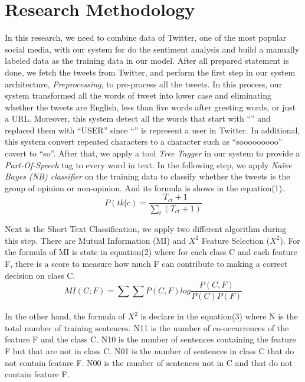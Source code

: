 \documentclass[a4paper,12pt]{article}
\begin{document}
\section{Research Methodology}
\hspace{1cm}In this research, we need to combine data of Twitter, one of the most popular social media, with our system for do the sentiment analysis and build a manually labeled data as the training data \cite{XBP2008} in our model. After all prepared statement is done, we fetch the tweets from Twitter, and perform the first step in our system architecture, \textit{Preprocessing}, to pre-process all the tweets. In this process, our system transformed all the words of tweet into lower case and eliminating whether the tweets are English, less than five words after greeting words, or just a URL. Moreover, this system detect all the words that start with “\@” and replaced them with “USER” since “\@” is represent a user in Twitter. In additional, this system convert repeated characters to a character such as “sooooooooo” covert to “so”.  After that, we apply a tool \textit{Tree Tagger} in our system to provide a \textit{Part-Of-Speech} tag to every word in text. In the following step, we apply \textit{Naïve Bayes (NB) classifier} on the training data to classify whether the tweets is the group of opinion or non-opinion. And its formula is shows in the equation(1).\linebreak \linebreak
\begin{equation}
P(tk|c) = \frac{T_{ct}+1}{\sum_{t}(T_{ct}+1)}
\end{equation} \linebreak \par
Next is the Short Text Classification, we apply two different algorithm during this step. There are Mutual Information (MI)\cite{Susan1998} and $X^2$ Feature Selection ($X^2$). For the formula of MI is state in equation(2) where for each class C and each feature F, there is a score to measure how much F can contribute to making a correct decision on class C.\linebreak \linebreak
\begin{equation}
MI(C;F) = \sum_{}\sum_{}P(C,F)log\frac{P(C,F)}{P(C)P(F)}
\end{equation}\linebreak \par
In the other hand, the formula of $X^2$ is declare in the equation(3) where N is the total number of training sentences. N11 is the number of co-occurrences of the feature F and the class C. N10 is the number of sentences containing the feature F but that are not in class C. N01 is the number of sentences in class C that do not contain feature F. N00 is the number of sentences not in C and that do not contain feature F.\linebreak \linebreak
\end{document}
